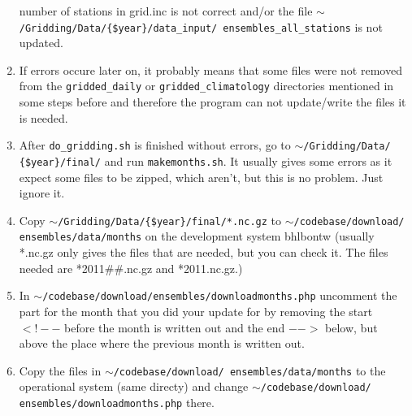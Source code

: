 \documentclass[a4paper]{article}
\begin{document}
\begin{enumerate}
  number of stations in grid.inc is not correct and/or the file
  \texttt{$\sim$/Gridding/Data/\{\$year\}/data\_input/ \linebreak ensembles\_all\_stations}
  is not updated.
\item If errors occure later on, it probably means that some files
  were not removed from the \texttt{gridded\_daily} or
  \texttt{gridded\_climatology} directories mentioned in some steps
  before and therefore the program can not update/write the files it
  is needed.
\item After \texttt{do\_gridding.sh} is finished without errors, go to
  \texttt{$\sim$/Gridding/Data/ \{\$year\}/final/} and run
  \texttt{makemonths.sh}. It usually gives some errors as it expect
  some files to be zipped, which aren't, but this is no problem. Just
  ignore it.
\item Copy \texttt{$\sim$/Gridding/Data/\{\$year\}/final/*.nc.gz} to
  \texttt{$\sim$/codebase/download/ ensembles/data/months} on the
  development system bhlbontw (usually *.nc.gz only gives the files
  that are needed, but you can check it. The files needed are
  *2011\#\#.nc.gz and *2011.nc.gz.)
\item In
  \texttt{$\sim$/codebase/download/ensembles/downloadmonths.php}
  uncomment the part for the month that you did your update for by
  removing the start $<!--$ before the month is written out and the
  end $-->$ below, but above the place where the previous month is
  written out.
\item Copy the files in
  \texttt{$\sim$/codebase/download/ ensembles/data/months} to the
  operational system (same directy) and change
  \texttt{$\sim$/codebase/download/ ensembles/downloadmonths.php}
  there.
\end{enumerate}
\end{document}
